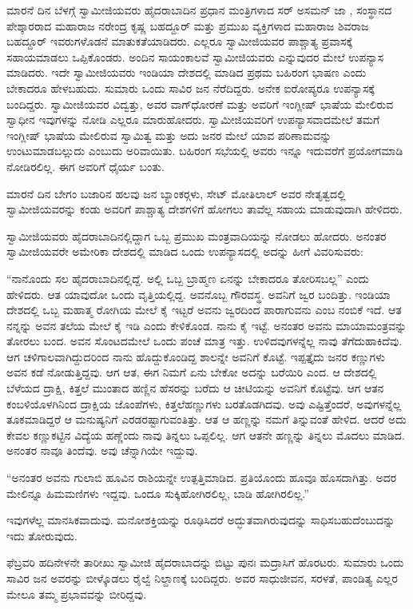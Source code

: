  ಮಾರನೆ ದಿನ ಬೆಳಗ್ಗೆ ಸ್ವಾಮೀಜಿಯವರು ಹೈದರಾಬಾದಿನ ಪ್ರಧಾನ ಮಂತ್ರಿಗಳಾದ ಸರ್ ಅಸಮನ್ ಜಾ , ಸಂಸ್ಥಾನದ ಪೇಶ್ಕಾರರಾದ ಮಹಾರಾಜ ನರೇಂದ್ರ ಕೃಷ್ಣ ಬಹದ್ದೂರ್ ಮತ್ತು ಪ್ರಮುಖ ವ್ಯಕ್ತಿಗಳಾದ ಮಹಾರಾಜ ಶಿವರಾಜ ಬಹದ್ದೂರ್ ಇವರುಗಳೊಡನೆ ಮಾತುಕತೆಯಾಡಿದರು. ಎಲ್ಲರೂ ಸ್ವಾಮೀಜಿಯವರ ಪಾಶ್ಚಾತ್ಯ ಪ್ರವಾಸಕ್ಕೆ ಸಹಾಯಮಾಡಲು ಒಪ್ಪಿಕೊಂಡರು. ಅಂದಿನ ಸಾಯಂಕಾಲವೆ ಸ್ವಾಮೀಜಿಯವರು  ಎನ್ನುವುದರ ಮೇಲೆ ಉಪನ್ಯಾಸ ಮಾಡಿದರು. ಇದೇ ಸ್ವಾಮೀಜಿಯವರು ಇಂಡಿಯಾ ದೇಶದಲ್ಲಿ ಮಾಡಿದ ಪ್ರಥಮ ಬಹಿರಂಗ ಭಾಷಣ ಎಂದು ಬೇಕಾದರೂ ಹೇಳಬಹುದು. ಸುಮಾರು ಒಂದು ಸಾವಿರ ಜನ ನೆರೆದಿದ್ದರು. ಅನೇಕ ಐರೋಪ್ಯರೂ ಉಪನ್ಯಾಸಕ್ಕೆ ಬಂದಿದ್ದರು. ಸ್ವಾಮೀಜಿಯವರ ವಿದ್ವತ್ತು, ಅವರ ವಾಗ್‍ಧೋರಣೆ ಮತ್ತು ಅವರಿಗೆ ಇಂಗ್ಲೀಷ್ ಭಾಷೆಯ ಮೇಲಿರುವ ಸ್ವಾಧೀನ ಇವುಗಳನ್ನು ನೋಡಿ ಎಲ್ಲರೂ ಮಾರುಹೋದರು. ಸ್ವಾಮೀಜಿಯವರಿಗೆ ಉಪನ್ಯಾಸವಾದಮೇಲೆ ತಮಗೆ ಇಂಗ್ಲೀಷ್ ಭಾಷೆಯ ಮೇಲಿರುವ ಸ್ವಾಮಿತ್ವ ಮತ್ತು ಅದು ಜನರ ಮೇಲೆ ಯಾವ ಪರಿಣಾಮವನ್ನು ಉಂಟುಮಾಡಬಲ್ಲುದು ಎಂಬುದು ಅರಿವಾಯಿತು. ಬಹಿರಂಗ ಸಭೆಯಲ್ಲಿ ಅವರು ಇನ್ನೂ ಇದುವರೆಗೆ ಪ್ರಯೋಗಮಾಡಿ ನೋಡಿರಲಿಲ್ಲ. ಈಗ ಅವರಿಗೆ ಧೈರ್ಯ ಬಂತು.

 ಮಾರನೆ ದಿನ ಬೇಗಂ ಬಜಾರಿನ ಹಲವು ಜನ ಬ್ಯಾಂಕರ್‍ಗಳು, ಸೇಟ್ ಮೋತಿ‍ಲಾಲ್ ಅವರ ನೇತೃತ್ವದಲ್ಲಿ ಸ್ವಾಮೀಜಿಯವರನ್ನು ಕಂಡು ಅವರಿಗೆ ಪಾಶ್ಚಾತ್ಯ ದೇಶಗಳಿಗೆ ಹೋಗಲು ತಾವೆಲ್ಲ ಸಹಾಯ ಮಾಡುವುದಾಗಿ ಹೇಳಿದರು. 

 ಸ್ವಾಮೀಜಿಯವರು ಹೈದರಾಬಾದಿನಲ್ಲಿದ್ದಾಗ ಒಬ್ಬ ಪ್ರಮುಖ ಮಂತ್ರವಾದಿಯನ್ನು ನೋಡಲು ಹೋದರು. ಅನಂತರ ಸ್ವಾಮೀಜಿಯವರೇ ಅಮೇರಿಕಾ ದೇಶದಲ್ಲಿ ಮಾಡಿದ ಒಂದು ಉಪನ್ಯಾಸದಲ್ಲಿ ಅದನ್ನು ಹೀಗೆ ವಿವರಿಸುವರು: 

 “ನಾನೊಂದು ಸಲ ಹೈದರಾಬಾದಿನಲ್ಲಿದ್ದೆ. ಅಲ್ಲಿ ಒಬ್ಬ ಬ್ರಾಹ್ಮಣ ಏನನ್ನು ಬೇಕಾದರೂ ತೋರಿಸಬಲ್ಲ” ಎಂದು ಹೇಳಿದರು. ಆತ ಯಾವುದೋ ಒಂದು ವೃತ್ತಿಯಲ್ಲಿದ್ದ. ಅವನೊಬ್ಬ ಗೌರವಸ್ಥ. ಅವನಿಗೆ ಜ್ವರ ಬಂದಿತ್ತು. ಇಂಡಿಯಾ ದೇಶದಲ್ಲಿ ಒಬ್ಬ ಮಹಾತ್ಮ ರೋಗಿಯ ಮೇಲೆ ಕೈ ಇಟ್ಟರೆ ಅವನು ಜ್ವರದಿಂದ ಪಾರಾಗುವನು ಎಂಬ ನಂಬಿಕೆ ಇದೆ. ಆತ ನನ್ನನ್ನು ಅವನ ತಲೆಯ ಮೇಲೆ ಕೈ ಇಡಿ ಎಂದು ಕೇಳಿಕೊಂಡ. ನಾನು ಕೈ ಇಟ್ಟೆ. ಅನಂತರ ಅವನು ಮಾಯಾಮಂತ್ರವನ್ನು ತೋರಲು ಬಂದ. ಅವನ ಸೊಂಟದಮೇಲೆ ಒಂದು ಪಂಚೆ ಮಾತ್ರ ಇತ್ತು. ಉಳಿದವುಗಳನ್ನೆಲ್ಲ ನಾವು ತೆಗೆದುಹಾಕಿದೆವು. ಆಗ ಚಳಿಗಾಲವಾಗಿದ್ದುದರಿಂದ ನಾನು ಹೊದ್ದುಕೊಂಡಿದ್ದ ಶಾಲನ್ನೇ ಅವನಿಗೆ ಕೊಟ್ಟೆ. ಇಪ್ಪತ್ತೈದು ಜನರ ಕಣ್ಣುಗಳು ಅವನ ಕಡೆ ನೋಡುತ್ತಿದ್ದವು. ಆಗ ಆತ, ಈಗ ನಿಮಗೆ ಏನು ಬೇಕೋ ಅದನ್ನು ಬರೆಯಿರಿ ಎಂದ. ಆ ದೇಶದಲ್ಲಿ ಬೆಳೆಯದ ದ್ರಾಕ್ಷಿ, ಕಿತ್ತಲೆ ಮುಂತಾದ ಹಣ್ಣಿನ ಹೆಸರನ್ನು ಬರೆದು ಆ ಚೀಟಿಯನ್ನು ಅವನಿಗೆ ಕೊಟ್ಟೆವು. ಆಗ ಆತನ ಕಂಬಳಿಯೊಳಗಿನಿಂದ ದ್ರಾಕ್ಷಿಯ ಜೊಂಪೆಗಳು, ಕಿತ್ತಲೆಹಣ್ಣುಗಳು ಬರತೊಡಗಿದವು. ಅವು ಎಷ್ಟಿತ್ತೆಂದರೆ, ಅವುಗಳನ್ನೆಲ್ಲ ತೂಕಮಾಡಿದ್ದರೆ ಆ ಮನುಷ್ಯನಿಗೆ ಎರಡರಷ್ಟಾಗುವಂತಿತ್ತು. ಆತ ಆ ಹಣ್ಣನ್ನು ನಮಗೆ ತಿನ್ನುವಂತೆ ಹೇಳಿದ. ಆದರೆ ಅದು ಕೇವಲ ಕಣ್ಣುಕಟ್ಟಿನ ವಿದ್ಯೆಯ ಹಣ್ಣೆಂದು ನಾವು ತಿನ್ನಲು ಒಪ್ಪಲಿಲ್ಲ. ಆಗ ಆತನೇ ಹಣ್ಣನ್ನು ತಿನ್ನಲು ಮೊದಲು ಮಾಡಿದ. ಅನಂತರ ನಾವೂ ತಿಂದೆವು. ಅವು ಚೆನ್ನಾಗಿಯೇ ಇದ್ದುವು. 

 “ಅನಂತರ ಅವನು ಗುಲಾಬಿ ಹೂವಿನ ರಾಶಿಯನ್ನೇ ಉತ್ಪತ್ತಿಮಾಡಿದ. ಪ್ರತಿಯೊಂದು ಹೂವೂ ಹೊಸದಾಗಿತ್ತು. ಅದರ ಮೇಲಿನ್ನೂ ಹಿಮಮಣಿಗಳು ಇದ್ದವು. ಒಂದೂ ಸುಕ್ಕಿಹೋಗಿರಲಿಲ್ಲ, ಬಾಡಿ ಹೋಗಿರಲಿಲ್ಲ.” 

 ಇವುಗಳೆಲ್ಲ ಮಾನಸಿಕವಾದುವು. ಮನೋಶಕ್ತಿಯನ್ನು ರೂಢಿಸಿದರೆ ಅದ್ಭುತವಾಗಿರುವುದನ್ನು ಸಾಧಿಸಬಹುದೆಂಬುದನ್ನು ಇದು ತೋರುವುದು.

 ಫೆಬ್ರವರಿ ಹದಿನೇಳನೇ ತಾರೀಖು ಸ್ವಾಮೀಜಿ ಹೈದರಾಬಾದನ್ನು ಬಿಟ್ಟು ಪುನಃ ಮದ್ರಾಸಿಗೆ ಹೊರಟರು. ಸುಮಾರು ಒಂದು ಸಾವಿರ ಜನ ಅವರನ್ನು ಬೀಳ್ಕೊಡಲು ರೈಲ್ವೆ ನಿಲ್ದಾಣಕ್ಕೆ ಬಂದಿದ್ದರು. ಅವರ ಸಾಧುಜೀವನ, ಸರಳತೆ, ಪಾಂಡಿತ್ಯ ಎಲ್ಲರ ಮೇಲೂ ತಮ್ಮ ಪ್ರಭಾವವನ್ನು ಬೀರಿದ್ದವು. 

